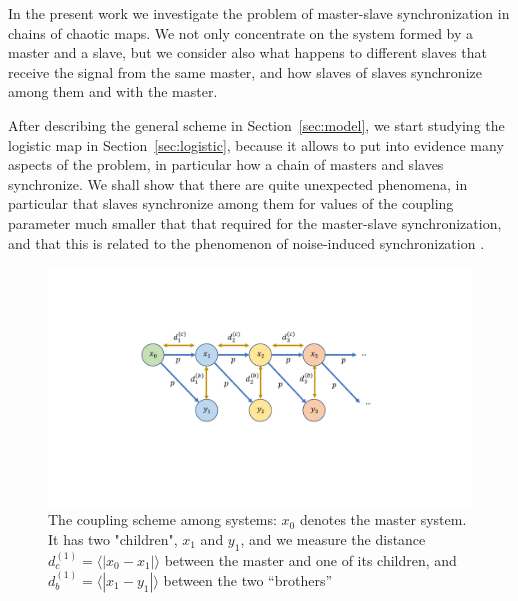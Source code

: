\documentclass[runningheads]{llncs}
\begin{document}
In the present work we investigate the problem of master-slave synchronization in chains of chaotic maps. We not only concentrate on the system formed by a master and a slave, but we consider also what happens to different slaves that receive the signal from the same master, and how slaves of slaves synchronize among them and with the master. 


After describing the general scheme in Section~\ref{sec:model}, we start studying the logistic map in Section~\ref{sec:logistic}, because it allows to put into evidence many aspects of the problem, in particular how a chain of masters and slaves synchronize. We shall show that there are quite unexpected phenomena, in particular that slaves synchronize among them for values of the coupling parameter much smaller that that required for the master-slave synchronization, and that this is related to the phenomenon of noise-induced synchronization \cite{Maritan1994}. 





\begin{figure}
    \centering
    \includegraphics[width=0.7\linewidth]{CouplingScheme.pdf}
    \caption{The  coupling scheme among systems: $x_0$ denotes the master system. It has two "children", $x_1$ and $y_1$, and we measure the distance $d^{(1)}_c=\langle|x_0-x_1|\rangle$ between the master and one of its children, and  $d^{(1)}_b=\langle|x_1-y_1|\rangle$ between the two ``brothers''}
    \label{fig:CouplingScheme}
\end{figure}
\end{document}
